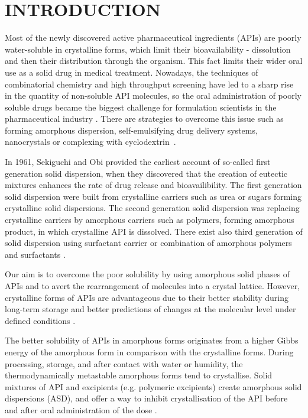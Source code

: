 \newpage
\section{INTRODUCTION}
\setcounter{page}{1}
\enlargethispage{\baselineskip}

Most of the newly discovered active pharmaceutical ingredients (APIs) are poorly water-soluble in crystalline forms, which limit their bioavailability - dissolution and then their distribution through the organism. This fact limits their wider oral use as a solid drug in medical treatment. Nowadays, the techniques of combinatorial chemistry and high throughput screening have led to a sharp rise in the quantity of non-soluble API molecules, so the oral administration of poorly soluble drugs became the biggest challenge for formulation scientists in the pharmaceutical industry \cite{leuner_improving_2000}. There are strategies to overcome this issue such as forming amorphous dispersion, self-emulsifying drug delivery systems, nanocrystals or complexing with cyclodextrin~\cite{singh_oral_2011}. 

In 1961, Sekiguchi and Obi provided the earliest account of so-called first generation solid dispersion, when they discovered that the creation of eutectic mixtures enhances the rate of drug release and bioavailibility. The first generation solid dispersion were built from crystalline carriers such as urea or sugars forming crystalline solid dispersions. The second generation solid dispersion was replacing crystalline carriers by amorphous carriers such as polymers, forming amorphous product, in which crystalline API is dissolved. There exist also third generation of solid dispersion using surfactant carrier or combination of amorphous polymers and surfactants \cite{vasconcelos_solid_2007}. 

Our aim is to overcome the poor solubility by using amorphous solid phases of APIs and to avert the rearrangement of molecules into a crystal lattice. However, crystalline forms of APIs are advantageous due to their better stability during long-term storage and better predictions of changes at the molecular level under defined conditions \cite{caron_comparison_2011}. 

The better solubility of APIs in amorphous forms originates from a higher Gibbs energy of the amorphous form in comparison with the crystalline forms. During processing, storage, and after contact with water or humidity, the thermodynamically metastable amorphous forms tend to crystallise. Solid mixtures of API and excipients (e.g. polymeric excipients) create amorphous solid dispersions (ASD), and offer a way to inhibit crystallisation of the API before and after oral administration of the dose \cite{prudic_thermodynamic_2014}.

